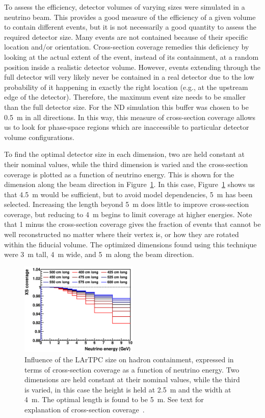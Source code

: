 To assess the efficiency, detector volumes of varying sizes were simulated in a neutrino beam.
This provides a good measure of the efficiency of a given volume to contain different events, but it is not necessarily a good quantity to assess the required detector size.
Many events are not contained because of their specific location and/or orientation.
Cross-section coverage remedies this deficiency by looking at the actual extent of the event, instead of its containment, at a random position inside a realistic detector volume.
However, events extending through the full detector will very likely never be contained in a real detector due to the low probability of it happening in exactly the right location (e.g., at the upstream edge of the detector).
Therefore, the maximum event size needs to be smaller than the full detector size.
For the ND simulation this buffer was chosen to be \SI{0.5}{\metre} in all directions.
In this way, this measure of cross-section coverage allows us to look for phase-space regions which are inaccessible to particular detector volume configurations.

To find the optimal detector size in each dimension, two are held constant at their nominal values, while the third dimension is varied and the cross-section coverage is plotted as a function of neutrino energy. 
This is shown for the dimension along the beam direction in Figure~\ref{fig:dune-nd_lartpc-size}. In this case, Figure~\ref{fig:dune-nd_lartpc-size} shows us that
\SI{4.5}{\metre} would be sufficient, but to avoid model dependencies, \SI{5}{\metre} has been selected.
Increasing the length beyond \SI{5}{\metre} does little to improve cross-section coverage, but reducing to \SI{4}{\metre} begins to limit coverage at higher energies.
Note that 1 minus the cross-section coverage gives the fraction of events that cannot be well reconstructed no matter where their vertex is, or how they are rotated within the fiducial volume. The optimized dimensions found using this technique were \SI{3}{\metre} tall, \SI{4}{\metre} wide, and \SI{5}{\metre} along the beam direction.

\begin{figure}[tbp]
	\centering
	\includegraphics[width=0.5\textwidth]{graphics/length.png}
	\caption{Influence of the LArTPC size on hadron containment, expressed in terms of cross-section coverage as a function of neutrino energy.
		Two dimensions are held constant at their nominal values, while the third is varied, in this case the height is held at \SI{2.5}{\metre} and the width at \SI{4}{\metre}.
		The optimal length is found to be \SI{5}{\metre}.
		See text for explanation of cross-section coverage~\cite{lartpcSizeChris}.}
	\label{fig:dune-nd_lartpc-size}
\end{figure}


